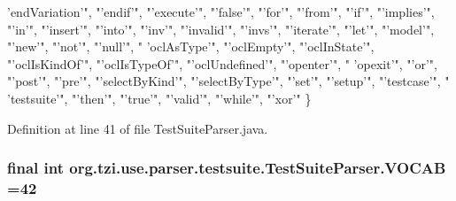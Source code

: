 \begin{DoxyCode}
{      'endVariation'"}, \textcolor{stringliteral}{"'endif'"}, \textcolor{stringliteral}{"'execute'"}, \textcolor{stringliteral}{"'false'"}, \textcolor{stringliteral}{"'for'"}, \textcolor{stringliteral}{"'from'"}, \textcolor{stringliteral}{"'if'"}, \textcolor{stringliteral}{"'implies'"}, \textcolor{stringliteral}{"'in'"}, \textcolor{stringliteral}{"'insert'"}, \textcolor{stringliteral}{
      "'into'"}, \textcolor{stringliteral}{"'inv'"}, \textcolor{stringliteral}{"'invalid'"}, \textcolor{stringliteral}{"'invs'"}, \textcolor{stringliteral}{"'iterate'"}, \textcolor{stringliteral}{"'let'"}, \textcolor{stringliteral}{"'model'"}, \textcolor{stringliteral}{"'new'"}, \textcolor{stringliteral}{"'not'"}, \textcolor{stringliteral}{"'null'"}, \textcolor{stringliteral}{"
      'oclAsType'"}, \textcolor{stringliteral}{"'oclEmpty'"}, \textcolor{stringliteral}{"'oclInState'"}, \textcolor{stringliteral}{"'oclIsKindOf'"}, \textcolor{stringliteral}{"'oclIsTypeOf'"}, \textcolor{stringliteral}{"'oclUndefined'"}, \textcolor{stringliteral}{"'openter'"}, \textcolor{stringliteral}{"
      'opexit'"}, \textcolor{stringliteral}{"'or'"}, \textcolor{stringliteral}{"'post'"}, \textcolor{stringliteral}{"'pre'"}, \textcolor{stringliteral}{"'selectByKind'"}, \textcolor{stringliteral}{"'selectByType'"}, \textcolor{stringliteral}{"'set'"}, \textcolor{stringliteral}{"'setup'"}, \textcolor{stringliteral}{"'testcase'"}, \textcolor{stringliteral}{"
      'testsuite'"}, \textcolor{stringliteral}{"'then'"}, \textcolor{stringliteral}{"'true'"}, \textcolor{stringliteral}{"'valid'"}, \textcolor{stringliteral}{"'while'"}, \textcolor{stringliteral}{"'xor'"}
    \}
\end{DoxyCode}


Definition at line 41 of file Test\-Suite\-Parser.\-java.

\hypertarget{classorg_1_1tzi_1_1use_1_1parser_1_1testsuite_1_1_test_suite_parser_a763cea1a91eece06667dfedb473f9743}{
\subsubsection[{V\-O\-C\-A\-B}]{\setlength{\rightskip}{0pt plus 5cm}final int org.\-tzi.\-use.\-parser.\-testsuite.\-Test\-Suite\-Parser.\-V\-O\-C\-A\-B =42\hspace{0.3cm}{\ttfamily [static]}}}\label{classorg_1_1tzi_1_1use_1_1parser_1_1testsuite_1_1_test_suite_parser_a763cea1a91eece06667dfedb473f9743}


